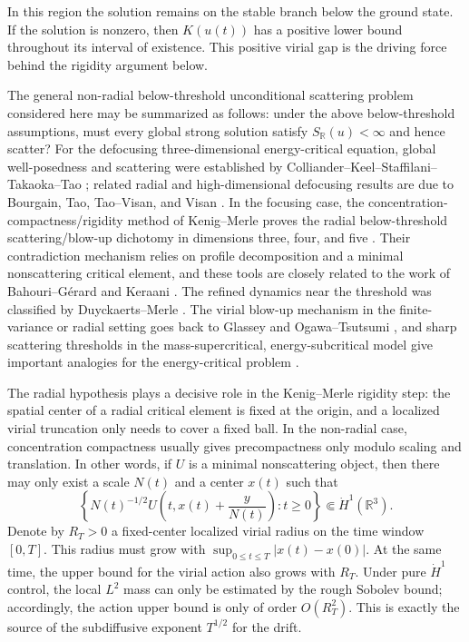 \documentclass[smallextended,envcountsect,nospthms]{svjour3}
\numberwithin{equation}{section}
\theoremstyle{spbreak}
\theoremstyle{spdefbreak}
\theoremstyle{spdefbreak}
\newcommand{\R}{\mathbb R}
\begin{document}
In this region the solution remains on the stable branch below the ground state. If the solution is nonzero, then $K(u(t))$ has a positive lower bound throughout its interval of existence. This positive virial gap is the driving force behind the rigidity argument below.

The general non-radial below-threshold unconditional scattering problem considered here may be summarized as follows: under the above below-threshold assumptions, must every global strong solution satisfy $S_\R(u)<\infty$ and hence scatter? For the defocusing three-dimensional energy-critical equation, global well-posedness and scattering were established by Colliander--Keel--Staffilani--Takaoka--Tao \cite{CKSTT2008}; related radial and high-dimensional defocusing results are due to Bourgain, Tao, Tao--Visan, and Visan \cite{Bourgain1999,Tao2005,TaoVisan2005,Visan2007}. In the focusing case, the concentration-compactness/rigidity method of Kenig--Merle proves the radial below-threshold scattering/blow-up dichotomy in dimensions three, four, and five \cite{KenigMerle2006}. Their contradiction mechanism relies on profile decomposition and a minimal nonscattering critical element, and these tools are closely related to the work of Bahouri--G\'erard and Keraani \cite{BahouriGerard1999,Keraani2001}. The refined dynamics near the threshold was classified by Duyckaerts--Merle \cite{DuyckaertsMerle2009}. The virial blow-up mechanism in the finite-variance or radial setting goes back to Glassey and Ogawa--Tsutsumi \cite{Glassey1977,OgawaTsutsumi1991}, and sharp scattering thresholds in the mass-supercritical, energy-subcritical model give important analogies for the energy-critical problem \cite{HolmerRoudenko2008,DuyckaertsHolmerRoudenko2008}.

The radial hypothesis plays a decisive role in the Kenig--Merle rigidity step: the spatial center of a radial critical element is fixed at the origin, and a localized virial truncation only needs to cover a fixed ball. In the non-radial case, concentration compactness usually gives precompactness only modulo scaling and translation. In other words, if $U$ is a minimal nonscattering object, then there may only exist a scale $N(t)$ and a center $x(t)$ such that
\[
  \left\{N(t)^{-1/2}U\left(t,x(t)+\frac{y}{N(t)}\right):t\ge0\right\}
  \Subset\dot H^1(\R^3).
\]
Denote by $R_T>0$ a fixed-center localized virial radius on the time window $[0,T]$. This radius must grow with $\sup_{0\le t\le T}|x(t)-x(0)|$. At the same time, the upper bound for the virial action also grows with $R_T$. Under pure $\dot H^1$ control, the local $L^2$ mass can only be estimated by the rough Sobolev bound; accordingly, the action upper bound is only of order $O(R_T^2)$. This is exactly the source of the subdiffusive exponent $T^{1/2}$ for the drift.
\end{document}

